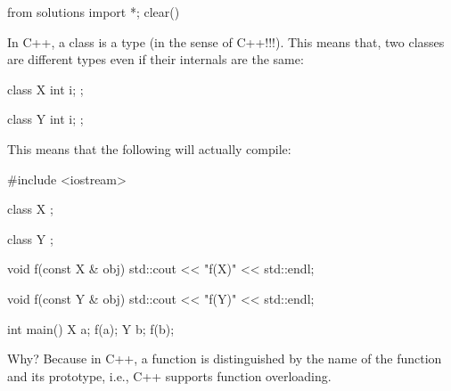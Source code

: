 \begin{python0}
from solutions import *; clear()
\end{python0}

In C++, a class is a type (in the sense of C++!!!). This means that, two
classes are different types even if their internals are the same:

\begin{consolethree}[escapeinside=||]
class X
{
    int i;
};

class Y
{
    int i;
};
\end{consolethree}


This means that the following will actually compile:

\begin{consolethree}[escapeinside=||]
#include <iostream>

class X
{
};

class Y
{
};

void f(const X & obj)
{
    std::cout << "f(X)" << std::endl;
}

void f(const Y & obj)
{
    std::cout << "f(Y)" << std::endl;
}

int main()
{
    X a;
    f(a);
    Y b;
    f(b);
}
\end{consolethree}

Why? Because in C++, a function is distinguished by the name of the
function and its prototype, i.e., C++ supports function overloading.


